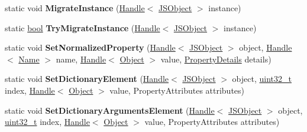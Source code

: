 \begin{DoxyCompactItemize}
static void {\bfseries Migrate\+Instance} (\mbox{\hyperlink{classv8_1_1internal_1_1Handle}{Handle}}$<$ \mbox{\hyperlink{classv8_1_1internal_1_1JSObject}{J\+S\+Object}} $>$ instance)
\item 
\mbox{\label{classv8_1_1internal_1_1JSObject_a95233ff548a330733c02362f81275abb}} 
static \mbox{\hyperlink{classbool}{bool}} {\bfseries Try\+Migrate\+Instance} (\mbox{\hyperlink{classv8_1_1internal_1_1Handle}{Handle}}$<$ \mbox{\hyperlink{classv8_1_1internal_1_1JSObject}{J\+S\+Object}} $>$ instance)
\item 
\mbox{\label{classv8_1_1internal_1_1JSObject_ad6feff8781a3b737d1060771d67fba3d}} 
static void {\bfseries Set\+Normalized\+Property} (\mbox{\hyperlink{classv8_1_1internal_1_1Handle}{Handle}}$<$ \mbox{\hyperlink{classv8_1_1internal_1_1JSObject}{J\+S\+Object}} $>$ object, \mbox{\hyperlink{classv8_1_1internal_1_1Handle}{Handle}}$<$ \mbox{\hyperlink{classv8_1_1internal_1_1Name}{Name}} $>$ name, \mbox{\hyperlink{classv8_1_1internal_1_1Handle}{Handle}}$<$ \mbox{\hyperlink{classv8_1_1internal_1_1Object}{Object}} $>$ value, \mbox{\hyperlink{classv8_1_1internal_1_1PropertyDetails}{Property\+Details}} details)
\item 
\mbox{\label{classv8_1_1internal_1_1JSObject_a6f8e02804d4b7f39678dc5dd35432bd3}} 
static void {\bfseries Set\+Dictionary\+Element} (\mbox{\hyperlink{classv8_1_1internal_1_1Handle}{Handle}}$<$ \mbox{\hyperlink{classv8_1_1internal_1_1JSObject}{J\+S\+Object}} $>$ object, \mbox{\hyperlink{classuint32__t}{uint32\+\_\+t}} index, \mbox{\hyperlink{classv8_1_1internal_1_1Handle}{Handle}}$<$ \mbox{\hyperlink{classv8_1_1internal_1_1Object}{Object}} $>$ value, Property\+Attributes attributes)
\item 
\mbox{\label{classv8_1_1internal_1_1JSObject_acf553b5cef4c5ce4285d1cf0754ad971}} 
static void {\bfseries Set\+Dictionary\+Arguments\+Element} (\mbox{\hyperlink{classv8_1_1internal_1_1Handle}{Handle}}$<$ \mbox{\hyperlink{classv8_1_1internal_1_1JSObject}{J\+S\+Object}} $>$ object, \mbox{\hyperlink{classuint32__t}{uint32\+\_\+t}} index, \mbox{\hyperlink{classv8_1_1internal_1_1Handle}{Handle}}$<$ \mbox{\hyperlink{classv8_1_1internal_1_1Object}{Object}} $>$ value, Property\+Attributes attributes)
\item 

\end{DoxyCompactItemize}
